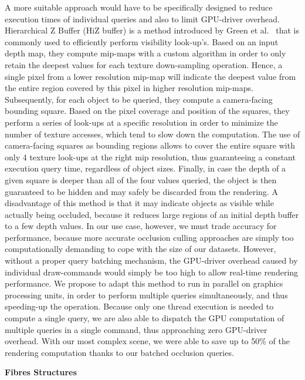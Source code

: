 A more suitable approach would have to be specifically designed to reduce execution times of individual queries and also to limit GPU-driver overhead.
Hierarchical Z Buffer (HiZ buffer) is a method introduced by Green et al.~\cite{greene1993hierarchical} that is commonly used to efficiently perform visibility look-up's.
Based on an input depth map, they compute mip-maps with a custom algorithm in order to only retain the deepest values for each texture down-sampling operation.
Hence, a single pixel from a lower resolution mip-map will indicate the deepest value from the entire region covered by this pixel in higher resolution mip-maps.
Subsequently, for each object to be queried, they compute a camera-facing bounding square.
Based on the pixel coverage and position of the squares, they perform a series of look-ups at a specific resolution in order to minimize the number of texture accesses, which tend to slow down the computation.
The use of camera-facing squares as bounding regions allows to cover the entire square with only 4 texture look-ups at the right mip resolution, thus guaranteeing a constant execution query time, regardless of object sizes.
Finally, in case the depth of a given square is deeper than all of the four values queried, the object is then guaranteed to be hidden and may safely be discarded from the rendering.
A disadvantage of this method is that it may indicate objects as visible while actually being occluded, because it reduces large regions of an initial depth buffer to a few depth values.
In our use case, however, we must trade accuracy for performance, because more accurate occlusion culling approaches are simply too computationally demanding to cope with the size of our datasets.
However, without a proper query batching mechanism, the GPU-driver overhead caused by individual draw-commands would simply be too high to allow real-time rendering performance.
We propose to adapt this method to run in parallel on graphics processing units, in order to perform multiple queries simultaneously, and thus speeding-up the operation.
Because only one thread execution is needed to compute a single query, we are also able to dispatch the GPU computation of multiple queries in a single command, thus approaching zero GPU-driver overhead.
With our most complex scene, we were able to save up to 50\% of the rendering computation thanks to our batched occlusion queries.

\textbf{Fibres Structures}


